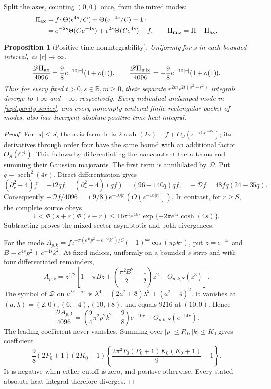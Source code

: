 \documentclass[11pt]{article}
\numberwithin{equation}{section}
\newtheorem{proposition}[theorem]{Proposition}
\theoremstyle{definition}
\theoremstyle{remark}
\newcommand{\R}{\mathbb R}
\begin{document}
Split the axes, counting $(0,0)$ once, from the mixed modes:
\begin{align}
 \Pi_{\rm ax}&=f\{\Theta(e^{4s}/C)+\Theta(e^{-4s}/C)-1\}\notag\\
 &=e^{-2s}\Theta(Ce^{-4s})+e^{2s}\Theta(Ce^{4s})-f,
 \qquad \Pi_{\rm mix}=\Pi-\Pi_{\rm ax}.\label{upd:axis-definition}
\end{align}
\begin{proposition}[Positive-time nonintegrability]
\label{upd:sector-obstruction}
Uniformly for $s$ in each bounded interval, as $|r|\to\infty$,
\[
 \frac{\mathscr D\Pi_{\rm ax}}{4096}
       =\frac98e^{-10|r|}(1+o(1)),\qquad
 \frac{\mathscr D\Pi_{\rm mix}}{4096}
       =-\frac98e^{-10|r|}(1+o(1)).
\]
Thus for every fixed $t>0,s\in\R,m\ge0$, their separate
$r^{2m}e^{2t(s^2+r^2)}$ integrals diverge to $+\infty$ and
$-\infty$, respectively.  Every individual undamped mode in
\eqref{upd:parity-series}, and every nonempty centered finite
rectangular packet of modes, also has divergent absolute positive-time
heat integral.
\end{proposition}
\begin{proof}
For $|s|\le S$, the axis formula is
$2\cosh(2s)-f+O_S(e^{-\pi Ce^{-4S}})$; its derivatives through order
four have the same bound with an additional factor $O_S(C^4)$.
This follows by differentiating the nonconstant theta terms and
summing their Gaussian majorants.  The first term is annihilated by
$\mathscr D$.  Put $q=\operatorname{sech}^2(4r)$. Direct differentiation
gives
\[
 (\partial_r^2-4)f=-12qf,\quad
 (\partial_r^2-4)(qf)=(96-140q)qf,\quad
 -\mathscr Df=48fq(24-35q).
\]
Consequently $-\mathscr Df/4096=(9/8)e^{-10|r|}
(O(e^{-18|r|}))$.  In contrast, for $r\ge S$, the complete source obeys
\[
 0<\Phi(s+r)\Phi(s-r)
 \le16\pi^4e^{18r}\exp\{-2\pi e^{4r}\cosh(4s)\}.
\]
Subtracting proves the mixed-sector asymptotic and both divergences.

For the mode
$A_{p,k}=f e^{-\pi(e^{4s}p^2+e^{-4s}k^2)/C}
(-1)^{pk}\cos(\pi pk\tau)$, put $z=e^{-4r}$ and
$B=e^{4s}p^2+e^{-4s}k^2$.  At fixed indices, uniformly on a bounded
$s$-strip and with four differentiated remainders,
\[
 A_{p,k}=z^{1/2}\left[1-\pi Bz+
            \left(\frac{\pi^2B^2}{2}-\frac12\right)z^2
            +O_{p,k,S}(z^3)\right].
\]
The symbol of $\mathscr D$ on $e^{\lambda s-ar}$ is
$\lambda^4-(2a^2+8)\lambda^2+(a^2-4)^2$.
It vanishes at $(a,\lambda)=(2,0),(6,\pm4),(10,\pm8)$, and equals
$9216$ at $(10,0)$. Hence
\begin{equation}
 \frac{\mathscr DA_{p,k}}{4096}
 =\left(\frac94\pi^2p^2k^2-\frac98\right)e^{-10r}
                  +O_{p,k,S}(e^{-14r}).\label{upd:mode-asymptotic}
\end{equation}
The leading coefficient never vanishes.  Summing over
$|p|\le P_0,|k|\le K_0$ gives coefficient
\[
 \frac98(2P_0+1)(2K_0+1)
 \left\{\frac{2\pi^2P_0(P_0+1)K_0(K_0+1)}9-1\right\}.
\]
It is negative when either cutoff is zero, and positive otherwise.
Every stated absolute heat integral therefore diverges.
\end{proof}
\end{document}
